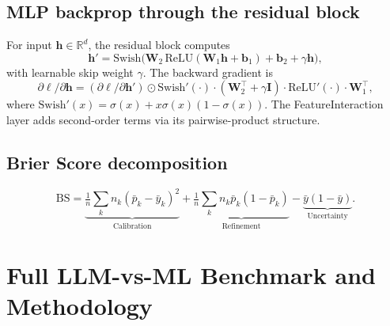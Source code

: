\documentclass[11pt, a4paper]{article}
\begin{document}
\subsection*{MLP backprop through the residual block}

For input $\mathbf{h}\!\in\!\mathbb{R}^d$, the residual block computes
\[
\mathbf{h}'=\text{Swish}\bigl(\mathbf{W}_2\,\text{ReLU}(\mathbf{W}_1\mathbf{h}+\mathbf{b}_1)+\mathbf{b}_2+\gamma\mathbf{h}\bigr),
\]
with learnable skip weight $\gamma$. The backward gradient is
\[
\partial\ell/\partial\mathbf{h}=(\partial\ell/\partial\mathbf{h}')\odot\text{Swish}'(\cdot)\cdot(\mathbf{W}_2^\top+\gamma\mathbf{I})\cdot\text{ReLU}'(\cdot)\cdot\mathbf{W}_1^\top,
\]
where $\text{Swish}'(x)=\sigma(x)+x\sigma(x)(1-\sigma(x))$. The FeatureInteraction layer adds second-order terms via its pairwise-product structure.

\subsection*{Brier Score decomposition}

\[
\text{BS}=\underbrace{\tfrac{1}{n}\!\sum_k n_k(\bar p_k-\bar y_k)^2}_{\text{Calibration}}
+\underbrace{\tfrac{1}{n}\!\sum_k n_k\bar p_k(1-\bar p_k)}_{\text{Refinement}}
-\underbrace{\bar y(1-\bar y)}_{\text{Uncertainty}}.
\]

\section{Full LLM-vs-ML Benchmark and Methodology}\label{app:llm_full}
\end{document}
